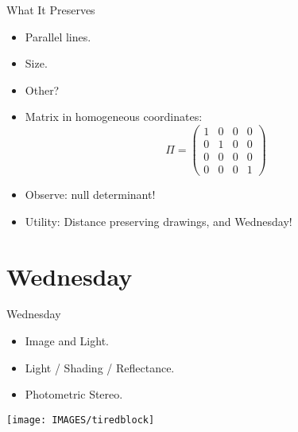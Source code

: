 \documentclass[9pt]{beamer}
\begin{document}
\begin{frame}[t]{What It Preserves}
  \begin{itemize}
  \item Parallel lines.
  \item Size.
  \item Other?
  \item Matrix in homogeneous coordinates:
    $$
    \Pi =
    \begin{pmatrix}
      1 & 0 & 0 & 0\\
      0 & 1 & 0 & 0\\
      0 & 0 & 0 & 0\\
      0 & 0 & 0 & 1
    \end{pmatrix}
    $$ 
  \item Observe: null determinant!
  \item Utility: Distance preserving drawings, and Wednesday!
  \end{itemize}
\end{frame}





\section{Wednesday}

\begin{frame}[t]{Wednesday}
  \begin{itemize}
  \item Image and Light.
  \item Light / Shading / Reflectance.
  \item Photometric Stereo.
  \end{itemize}
  
\end{frame}


\begin{frame}
   \begin{center}
    \texttt{[image: IMAGES/tiredblock]}
  \end{center}
\end{frame}
\end{document}
